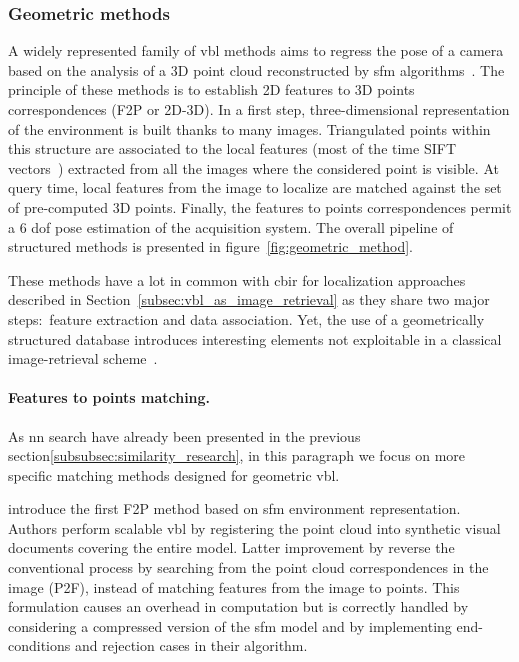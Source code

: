 \subsubsection{Geometric methods}


\label{subsubsec:sfm_methods}
A widely represented family of \ac{vbl} methods aims to regress the pose of a camera based on the analysis of a 3D point cloud reconstructed by \ac{sfm} algorithms~\citep{schoenberger2016sfm,moulon2016openmvg,rupnik2017micmac}. The principle of these methods is to establish 2D features to 3D points correspondences (F2P or 2D-3D). In a first step, three-dimensional representation of the environment is built thanks to many images. Triangulated points within this structure are associated to the local features (most of the time SIFT vectors~\citep{Lowe2004}) extracted from all the images where the considered point is visible. At query time, local features from the image to localize are matched against the set of pre-computed 3D points. Finally, the features to points correspondences permit a 6 \ac{dof} pose estimation of the acquisition system. The overall pipeline of structured methods is presented in figure~\ref{fig:geometric_method}.

These methods have a lot in common with \ac{cbir} for localization approaches described in Section~\ref{subsec:vbl_as_image_retrieval} as they share two major steps:~feature extraction and data association. Yet, the use of a geometrically structured database introduces interesting elements not exploitable in a classical image-retrieval scheme~\citep{Sattler2012a}.

\paragraph{Features to points matching.}
As \ac{nn} search have already been presented in the previous section\ref{subsubsec:similarity_research}, in this paragraph we focus on more specific matching methods designed for geometric \ac{vbl}.

\citet{Irschara2009} introduce the first F2P method based on \ac{sfm} environment representation. Authors perform scalable \ac{vbl} by registering the point cloud into synthetic visual documents covering the entire model. Latter improvement by \citet{Li2010} reverse the conventional process by searching from the point cloud correspondences in the image (P2F), instead of matching features from the image to points. This formulation causes an overhead in computation but is correctly handled by considering a compressed version of the \ac{sfm} model and by implementing end-conditions and rejection cases in their algorithm.

